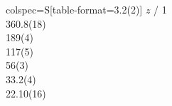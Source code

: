 \begin{tblr}{colspec={S[table-format=3.2(2)]}}
{{{$z$ / \si{1}}}}\\
360.8(18)\\
189(4)\\
117(5)\\
56(3)\\
33.2(4)\\
22.10(16)\\
\end{tblr}
